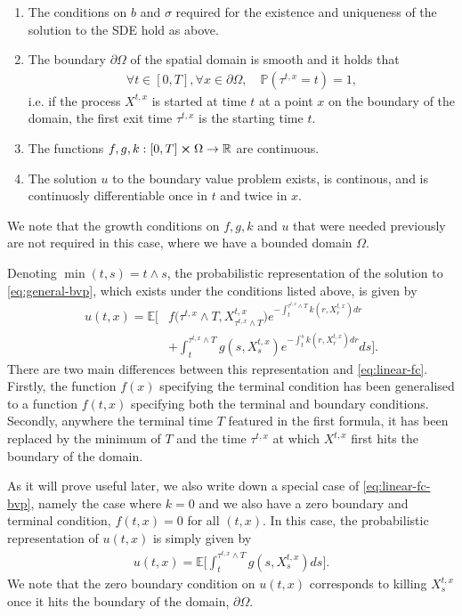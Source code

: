 \begin{enumerate}
    \item The conditions on $b$ and $\sigma$ required for the existence and uniqueness of the solution to the SDE hold as above.
    \item The boundary $\partial \Omega$ of the spatial domain is smooth and it holds that 
    \begin{align} 
        \forall t \in [0,T], \forall x \in \partial \Omega, \quad \mathbb{P}(\tau^{t,x}=t) = 1, 
    \end{align}
    i.e. if the process $X^{t,x}$ is started at time $t$ at a point $x$ on the boundary of the domain, the first exit time $\tau^{t,x}$ is the starting time $t$.
    \item The functions $f,g,k : [0,T] \cross \Omega \rightarrow \mathbb{R}$ are continuous.
    \item The solution $u$ to the boundary value problem exists, is continous, and is continuosly differentiable once in $t$ and twice in $x$.
\end{enumerate}
We note that the growth conditions on $f,g,k$ and $u$ that were needed previously are not required in this case, where we have a bounded domain $\Omega$.

Denoting $\min{(t,s)} = t \wedge s$, the probabilistic representation of the solution to \autoref{eq:general-bvp}, which exists under the conditions listed above, is given by
%
\begin{align} 
    \label{eq:linear-fc-bvp}
    u(t,x) = \mathbb{E} \bigg[ &f\big(\tau^{t,x} \wedge T , X^{t,x}_{\tau^{t,x}\wedge T}\big) e^{-\int_t^{\tau^{t,x}\wedge T} k(r,X^{t,x}_r) dr}\\
    & + \int_t^{\tau^{t,x}\wedge T} g(s,X^{t,x}_s) e^{-\int_t^s k(r,X^{t,x}_r) dr} ds \bigg].
\end{align}
%
There are two main differences between this representation and \autoref{eq:linear-fc}. Firstly, the function $f(x)$ specifying the terminal condition has been generalised to a function $f(t,x)$ specifying both the terminal and boundary conditions. Secondly, anywhere the terminal time $T$ featured in the first formula, it has been replaced by the minimum of $T$ and the time $\tau^{t,x}$ at which $X^{t,x}$ first hits the boundary of the domain.

As it will prove useful later, we also write down a special case of \autoref{eq:linear-fc-bvp}, namely the case where $k=0$ and we also have a zero boundary and terminal condition, $f(t,x)=0$ for all $(t,x)$. In this case, the probabilistic representation of $u(t,x)$ is simply given by
%
\begin{align} 
    u(t,x) = \mathbb{E} \bigg[ \int_t^{\tau^{t,x}\wedge T} g(s,X^{t,x}_s) ds \bigg].
\end{align}
%
We note that the zero boundary condition on $u(t,x)$ corresponds to killing $X_s^{t,x}$ once it hits the boundary of the domain, $\partial \Omega$.

